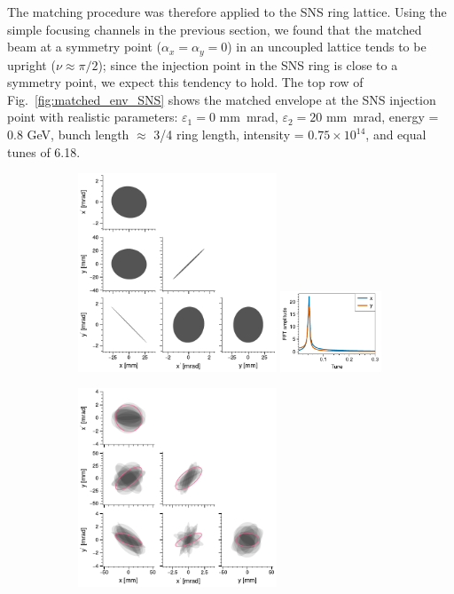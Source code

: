 The matching procedure was therefore applied to the SNS ring lattice. Using the simple focusing channels in the previous section, we found that the matched beam at a symmetry point ($\alpha_x = \alpha_y = 0$) in an uncoupled lattice tends to be upright ($\nu \approx \pi/2$); since the injection point in the SNS ring is close to a symmetry point, we expect this tendency to hold. The top row of Fig.~\ref{fig:matched_env_SNS} shows the matched envelope at the SNS injection point with realistic parameters: $\varepsilon_1 = 0$ mm~mrad, $\varepsilon_2 = 20$ mm~mrad, energy = 0.8 GeV, bunch length $\approx$ 3/4 ring length, intensity = $0.75 \times 10^{14}$, and equal tunes of 6.18.
%
\begin{figure}[!p]
    \centering
    \begin{subfigure}[t]{\textwidth}
        \includegraphics[width=0.65\textwidth, valign=t]{Images/chapter2/matched_env_SNS.pdf}
        \includegraphics[width=0.33\textwidth, valign=t]{Images/chapter2/matched_env_SNS_fft.pdf}
    \end{subfigure}
    \vfill
    \vspace*{0.6cm}
    \vfill
    \begin{subfigure}[b]{\textwidth}
        \includegraphics[width=0.65\textwidth, valign=t]{Images/chapter2/mismatched_env_SNS.pdf}

\end{subfigure}
\end{figure}
